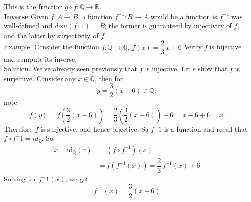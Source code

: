 \documentclass{article}
\begin{document}
This is the function \(g\circ f: \mathbb{Q} \to \mathbb{R}\).\\
\textbf{Inverse} Given \(f: A \to B\), a function \(f^{-1}:B \to A\) would be a function is \(f^{-1}\) was well-defined and \(dom(f^-1) = B\); the former is guaranteed by injectivity of \(f\), and the latter by surjectivity of \(f\).\\
Example. Consider the function \(f: \mathbb{Q} \to \mathbb{Q},\ f(x) = \dfrac{2}{3}\,x + 6\) Verify \(f\) is bijective and compute its inverse.\\
Solution. We've already seen previously that \(f\) is injective. Let's show that \(f\) is surjective. Consider any \(x \in \mathbb{Q}\), then for 
\[y = \dfrac{3}{2}(x-6) \in \mathbb{Q},\]
note
\[f(y) = f\left(\dfrac{3}{2}(x-6)\right) = \dfrac{2}{3}\left(\dfrac{3}{2}(x-6)\right) + 6 = x - 6 + 6 = x.\]
Therefore \(f\) is surjective, and hence bijective. So \(f^-1\) is a function and recall that \(f\circ f^-1 = id_\mathbb{Q}\). So 
\begin{align*} x = \mathrm{id}_{\mathbb{Q}}(x) &= (f\circ f^{-1})(x)\\[0.5em] &= f(f^{-1}(x)) = \dfrac{2}{3}\,f^{-1}(x) + 6 \end{align*}
Solving for \(f^-1(x)\), we get 
\[f^{-1}(x) = \dfrac{3}{2}(x-6)\]
\end{document}
